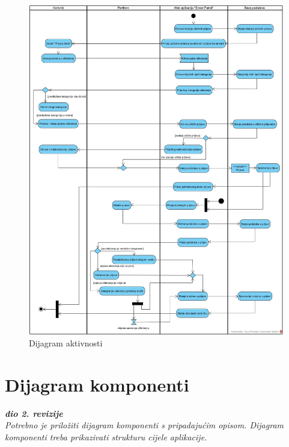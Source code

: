 			\begin{figure}[H]
				\includegraphics[width=\textwidth]{slike/dijagramAktivnosti.jpg} %
				\caption{Dijagram aktivnosti}
				\label{fig:dijagramAktivnosti} %
			\end{figure}
			
			\eject
			\section{Dijagram komponenti}
			
			\textbf{\textit{dio 2. revizije}}\\
			
			\textit{Potrebno je priložiti dijagram komponenti s pripadajućim opisom. Dijagram komponenti treba prikazivati strukturu cijele aplikacije.}
